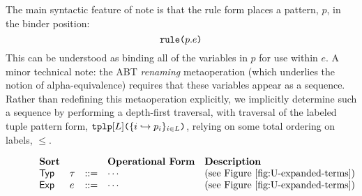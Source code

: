 {{{{The main syntactic feature of note is that the rule form places a pattern, $p$, in the binder position:
\[
\texttt{rule}\texttt{(}p.e\texttt{)}
\]
This can be understood as binding all of the variables in $p$ for use within $e$. A minor technical note: the ABT \emph{renaming} metaoperation (which underlies the notion of alpha-equivalence) requires that these variables appear as a sequence. Rather than redefining this metaoperation explicitly, we implicitly determine such a sequence by performing a depth-first traversal, with traversal of the labeled tuple pattern form, $\texttt{tplp}[L]\texttt{(}\{i \hookrightarrow p_{i}\}_{i \in L}\texttt{)}$, relying on some total ordering on labels, $\leq$.

\begin{figure}
\[\begin{array}{lllllll}
\textbf{Sort} & & 
& \textbf{Operational Form} 
& \textbf{Description}\\
\mathsf{Typ} & \tau & ::= 
& \cdots
& \text{(see Figure \ref{fig:U-expanded-terms})}\\
\mathsf{Exp} & e & ::= 
& \cdots 
& \text{(see Figure \ref{fig:U-expanded-terms})}\\

\end{array}\]
\end{figure}}}}}
